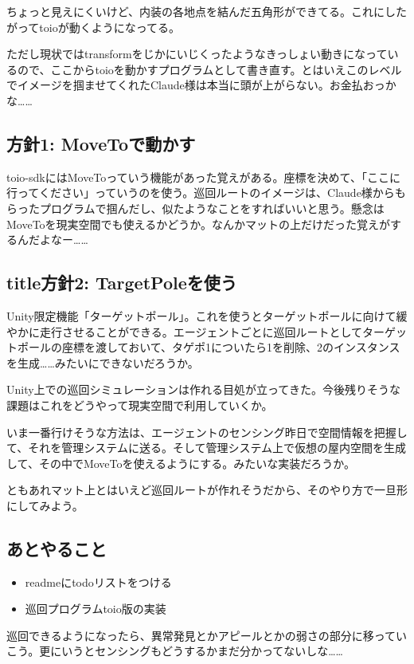 \documentclass[fleqn,twocolumn]{mynote}
\begin{document}
  ちょっと見えにくいけど、内装の各地点を結んだ五角形ができてる。これにしたがってtoioが動くようになってる。

  ただし現状ではtransformをじかにいじくったようなきっしょい動きになっているので、ここからtoioを動かすプログラムとして書き直す。とはいえこのレベルでイメージを掴ませてくれたClaude様は本当に頭が上がらない。お金払おっかな……

  \subsection*{方針1: MoveToで動かす}
  toio-sdkにはMoveToっていう機能があった覚えがある。座標を決めて、「ここに行ってください」っていうのを使う。巡回ルートのイメージは、Claude様からもらったプログラムで掴んだし、似たようなことをすればいいと思う。懸念はMoveToを現実空間でも使えるかどうか。なんかマットの上だけだった覚えがするんだよなー……

  \subsection*{title方針2: TargetPoleを使う}
  Unity限定機能「ターゲットポール」。これを使うとターゲットポールに向けて緩やかに走行させることができる。エージェントごとに巡回ルートとしてターゲットポールの座標を渡しておいて、タゲポ1についたら1を削除、2のインスタンスを生成……みたいにできないだろうか。

  Unity上での巡回シミュレーションは作れる目処が立ってきた。今後残りそうな課題はこれをどうやって現実空間で利用していくか。

  いま一番行けそうな方法は、エージェントのセンシング昨日で空間情報を把握して、それを管理システムに送る。そして管理システム上で仮想の屋内空間を生成して、その中でMoveToを使えるようにする。みたいな実装だろうか。

  ともあれマット上とはいえど巡回ルートが作れそうだから、そのやり方で一旦形にしてみよう。

  \subsection*{あとやること}
  \begin{itemize}
    \item readmeにtodoリストをつける
    \item 巡回プログラムtoio版の実装
  \end{itemize}

  巡回できるようになったら、異常発見とかアピールとかの弱さの部分に移っていこう。更にいうとセンシングもどうするかまだ分かってないしな……
\end{document}
